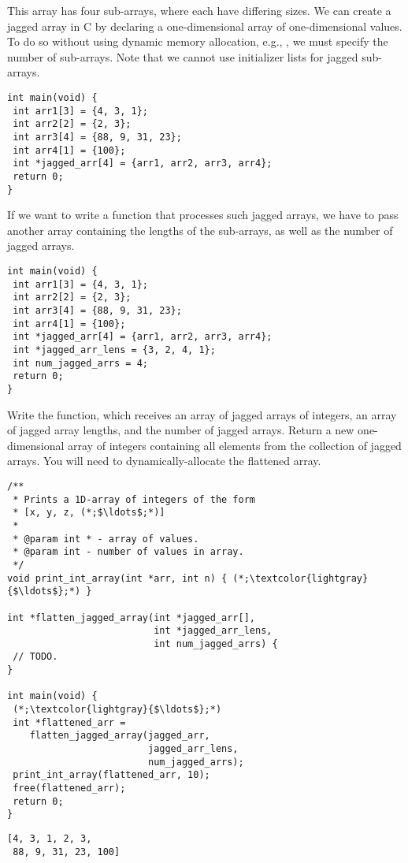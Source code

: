 This array has four sub-arrays, where each have differing sizes. We can create a jagged array in C by declaring a one-dimensional array of one-dimensional values. To do so without using dynamic memory allocation, e.g., , we must specify the number of sub-arrays. Note that we cannot use initializer lists for jagged sub-arrays.  
\begin{cl}[]{}
\begin{lstlisting}[language=MyC]
int main(void) {
 int arr1[3] = {4, 3, 1};
 int arr2[2] = {2, 3};
 int arr3[4] = {88, 9, 31, 23};
 int arr4[1] = {100};
 int *jagged_arr[4] = {arr1, arr2, arr3, arr4};
 return 0;
}
\end{lstlisting}
\end{cl}
If we want to write a function that processes such jagged arrays, we have to pass another array containing the lengths of the sub-arrays, as well as the number of jagged arrays.
\begin{cl}[]{}
\begin{lstlisting}[language=MyC]
int main(void) {
 int arr1[3] = {4, 3, 1};
 int arr2[2] = {2, 3};
 int arr3[4] = {88, 9, 31, 23};
 int arr4[1] = {100};
 int *jagged_arr[4] = {arr1, arr2, arr3, arr4};
 int *jagged_arr_lens = {3, 2, 4, 1};
 int num_jagged_arrs = 4;
 return 0;
}
\end{lstlisting}
\end{cl}
Write the  function, which receives an array of jagged arrays of integers, an array of jagged array lengths, and the number of jagged arrays. Return a new one-dimensional array of integers containing all elements from the collection of jagged arrays. You will need to dynamically-allocate the flattened array. 
\begin{clo}[]{}
\begin{lstlisting}[language=MyC]
/**
 * Prints a 1D-array of integers of the form
 * [x, y, z, (*;$\ldots$;*)]
 *
 * @param int * - array of values.
 * @param int - number of values in array.
 */
void print_int_array(int *arr, int n) { (*;\textcolor{lightgray}{$\ldots$};*) }

int *flatten_jagged_array(int *jagged_arr[], 
                          int *jagged_arr_lens, 
                          int num_jagged_arrs) {
 // TODO.                          
}

int main(void) {
 (*;\textcolor{lightgray}{$\ldots$};*)
 int *flattened_arr = 
    flatten_jagged_array(jagged_arr, 
                         jagged_arr_lens, 
                         num_jagged_arrs);
 print_int_array(flattened_arr, 10);
 free(flattened_arr);
 return 0;
}
\end{lstlisting}
\tcblower
\begin{lstlisting}[language=MyOutput]
[4, 3, 1, 2, 3, 
 88, 9, 31, 23, 100]
\end{lstlisting}
\end{clo}


